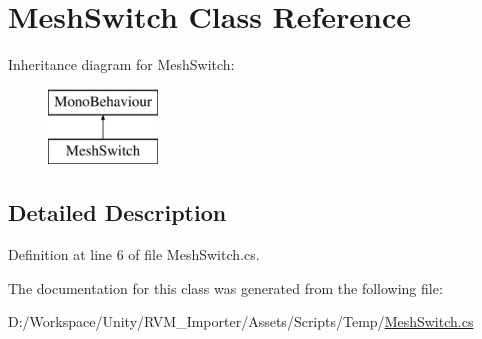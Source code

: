 \hypertarget{class_mesh_switch}{}\section{Mesh\+Switch Class Reference}
\label{class_mesh_switch}
Inheritance diagram for Mesh\+Switch\+:\begin{figure}[H]
\begin{center}
\leavevmode
\includegraphics[height=2.000000cm]{class_mesh_switch}
\end{center}
\end{figure}


\subsection{Detailed Description}


Definition at line 6 of file Mesh\+Switch.\+cs.



The documentation for this class was generated from the following file\+:\begin{DoxyCompactItemize}
\item 
D\+:/\+Workspace/\+Unity/\+R\+V\+M\+\_\+\+Importer/\+Assets/\+Scripts/\+Temp/\mbox{\hyperlink{_mesh_switch_8cs}{Mesh\+Switch.\+cs}}\end{DoxyCompactItemize}

